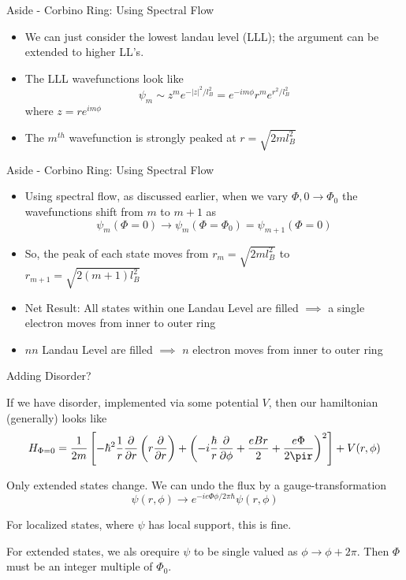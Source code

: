 \documentclass[12pt, aspectratio=169]{beamer}
\begin{document}
\begin{frame}{Aside - Corbino Ring: Using Spectral Flow}
    \begin{itemize}
        \item <1->{We can just consider the lowest landau level (LLL); the argument can be extended to higher LL's.}
        \item <2->{The LLL wavefunctions look like $$\psi_m \sim z^m e^{-|z|^2/l_B^2} = e^{-im\phi}r^m e^{r^2/l_B^2}$$ where $z = re^{im\phi}$}
        \item <3->{The $m^{th}$ wavefunction is strongly peaked at $r = \sqrt{2ml_B^2}$}
    \end{itemize}
\end{frame}


\begin{frame}{Aside - Corbino Ring: Using Spectral Flow}
    \begin{itemize}

        \item <1->{Using spectral flow, as discussed earlier, when we vary $\Phi, 0 \rightarrow \Phi_0$ the wavefunctions shift from $m$ to $m+1$ as $$\psi_m(\Phi = 0) \rightarrow \psi_m(\Phi = \Phi_0) = \psi_{m+1}(\Phi = 0)$$}
        \item <2->{So, the peak of each state moves from $r_m = \sqrt{2ml_B^2}$ to $r_{m+1} = \sqrt{2(m+1)l_B^2}$} 
        \item <3->{Net Result: All states within one Landau Level are filled $\implies$ a single electron moves from inner to outer ring}
        \item <4->{$nn$ Landau Level are filled $\implies$ $n$ electron moves from inner to outer ring}
    \end{itemize}
\end{frame}

\begin{frame}{Adding Disorder?}
    \item <1->{If we have disorder, implemented via some potential $V$, then our hamiltonian (generally) looks like $$H_{\Phi=0} = \frac{1}{2m} \left[ -\hbar^2 \frac{1}{r} \frac{\partial}{\partial r} \left(r \frac{\partial}{\partial r}\right) + \left(-i \frac{\hbar}{r} \frac{\partial}{\partial \phi} + \frac{eBr}{2} + \frac{e\Phi}{2\pir} \right)^2 \right] + V(r, \phi) $$}
    \item <2->{Only extended states change. We can undo the flux by a gauge-transformation $$\psi(r,\phi) \rightarrow e^{-ie\Phi\phi/2\pi\hbar} \psi(r, \phi)$$}
    \item <3->{For localized states, where $\psi$ has local support, this is fine.}
    \item <3->{For extended states, we als orequire $\psi$ to be single valued as $\phi \rightarrow \phi + 2\pi$. Then $\Phi$ must be an integer multiple of $\Phi_0$.}
\end{frame}
\end{document}
